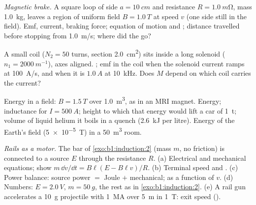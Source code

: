 \begin{exercise}[$\star\star$]\label{exo:b1:induction:7}
\emph{Magnetic brake.} A square loop of side $a = \qty{10}{cm}$ and
resistance $R = \qty{1.0}{m\ohm}$, mass \qty{1.0}{kg}, leaves a region of
uniform field $B = \qty{1.0}{T}$ at speed $v$ (one side still in the
field). Emf, current, braking force; equation of motion and ; distance travelled before stopping from \qty{1.0}{m/s}; where
did the  go?
\end{exercise}

\begin{exercise}[$\star\star$]\label{exo:b1:induction:8}
A small coil ($N_2 = 50$ turns, section \qty{2.0}{cm^2}) sits inside a
long solenoid ($n_1 = \qty{2000}{m^{-1}}$), axes aligned. ; emf in the coil when the solenoid current ramps at
\qty{100}{A/s}, and when it is $\qty{1.0}{A}$ at \qty{10}{kHz}. Does $M$
depend on which coil carries the current?
\end{exercise}

\begin{exercise}[$\star\star$]\label{exo:b1:induction:9}
Energy in a field: $B = \qty{1.5}{T}$ over \qty{1.0}{m^3}, as in an MRI
magnet. Energy; inductance for $I = \qty{500}{A}$; height to which that
energy would lift a car of \qty{1}{t}; volume of liquid helium it boils
in a quench (\qty{2.6}{kJ} per litre). Energy of the Earth's field
(\qty{5e-5}{T}) in a \qty{50}{m^3} room.
\end{exercise}

\begin{exercise}[$\star\star\star$]\label{exo:b1:induction:10}
\emph{Rails as a motor.} The bar of \cref{exo:b1:induction:2} (mass $m$,
no friction) is connected to a source $E$ through the resistance $R$.
(a) Electrical and mechanical equations; show $m\,\dd v/\dd t = B\ell(E -
B\ell v)/R$. (b) Terminal speed and . (c) Power balance:
source power $=$ Joule $+$ mechanical;  as a function of
$v$. (d) Numbers: $E = \qty{2.0}{V}$, $m = \qty{50}{g}$, the rest as in
\cref{exo:b1:induction:2}. (e) A rail gun accelerates a \qty{10}{g}
projectile with \qty{1}{MA} over \qty{5}{m} in \qty{1}{T}: exit speed
().
\end{exercise}


